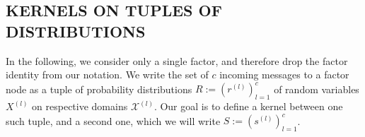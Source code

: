 \documentclass[english]{article}
\theoremstyle{plain}
\theoremstyle{plain}
\newcommand{\factor}{f}				%
\newcommand{\outV}{V}                         %
\newcommand{\approxMsg}[3]{M_{#1 \rightarrow #2}^{#3}}			%
\newcommand{\uncertaintyMsg}[3]{{\mathfrak V}_{#1 \rightarrow #2}^{#3}}			%
\newcommand{\secref}[1]{Section~\ref{#1}}
\begin{document}
%
%
%


\subsection{KERNELS ON TUPLES OF DISTRIBUTIONS}\label{sec:kernelsOnDistributions}

In the following, we consider only a single factor, and therefore drop the factor identity from our notation. We write the set of $c$ incoming messages to a factor node as a tuple of
probability distributions %
$R:=(r^{(l)})_{l=1}^c$ of random variables $X^{(l)}$ on respective  domains $\mathcal{X}^{(l)}$.
Our goal is to define a kernel between one such tuple, and a second one,
which we will write %
$S:=(s^{(l)})_{l=1}^c$.
\end{document}
